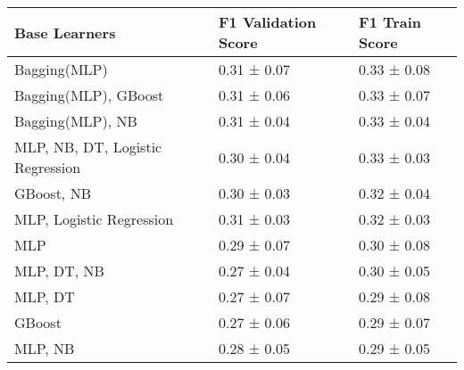 \begin{tabular}{lll}
\toprule
Base Learners & F1 Validation Score & F1 Train Score \\
\midrule
Bagging(MLP) & 0.31 ± 0.07 & 0.33 ± 0.08 \\
Bagging(MLP), GBoost & 0.31 ± 0.06 & 0.33 ± 0.07 \\
Bagging(MLP), NB & 0.31 ± 0.04 & 0.33 ± 0.04 \\
MLP, NB, DT, Logistic Regression & 0.30 ± 0.04 & 0.33 ± 0.03 \\
GBoost, NB & 0.30 ± 0.03 & 0.32 ± 0.04 \\
MLP, Logistic Regression & 0.31 ± 0.03 & 0.32 ± 0.03 \\
MLP & 0.29 ± 0.07 & 0.30 ± 0.08 \\
MLP, DT, NB & 0.27 ± 0.04 & 0.30 ± 0.05 \\
MLP, DT & 0.27 ± 0.07 & 0.29 ± 0.08 \\
GBoost & 0.27 ± 0.06 & 0.29 ± 0.07 \\
MLP, NB & 0.28 ± 0.05 & 0.29 ± 0.05 \\
\bottomrule
\end{tabular}
